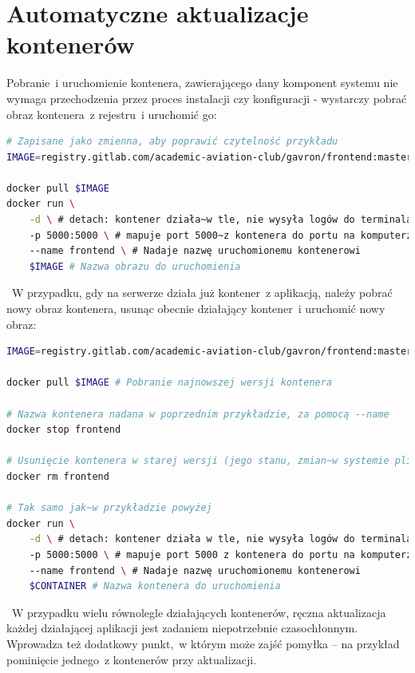 \section{Automatyczne aktualizacje kontenerów} \label{ouroboros}

Pobranie~i uruchomienie kontenera, zawierającego dany komponent systemu
nie wymaga przechodzenia przez proces instalacji czy konfiguracji - wystarczy
pobrać obraz kontenera~z rejestru~i uruchomić go:

\begin{lstlisting}[language=bash, label=list:docker_clone_run_example,caption={Pobranie~i uruchomienie obrazu dockera, zawierającego aplikację}, basicstyle=\footnotesize\ttfamily]
# Zapisane jako zmienna, aby poprawić czytelność przykładu 
IMAGE=registry.gitlab.com/academic-aviation-club/gavron/frontend:master

docker pull $IMAGE
docker run \
    -d \ # detach: kontener działa~w tle, nie wysyła logów do terminala
    -p 5000:5000 \ # mapuje port 5000~z kontenera do portu na komputerze  
    --name frontend \ # Nadaje nazwę uruchomionemu kontenerowi
    $IMAGE # Nazwa obrazu do uruchomienia 
\end{lstlisting}
~W przypadku, gdy na serwerze działa już kontener~z aplikacją, należy
pobrać nowy obraz kontenera, usunąc obecnie działający kontener~i uruchomić
nowy obraz:

\begin{lstlisting}[language=bash, label=list:docker_update_container,caption={Aktualizacja kontenerów}, basicstyle=\footnotesize\ttfamily]
IMAGE=registry.gitlab.com/academic-aviation-club/gavron/frontend:master

docker pull $IMAGE # Pobranie najnowszej wersji kontenera

# Nazwa kontenera nadana w poprzednim przykładzie, za pomocą --name
docker stop frontend

# Usunięcie kontenera w starej wersji (jego stanu, zmian~w systemie plików)
docker rm frontend

# Tak samo jak~w przykładzie powyżej
docker run \
    -d \ # detach: kontener działa w tle, nie wysyła logów do terminala
    -p 5000:5000 \ # mapuje port 5000 z kontenera do portu na komputerze  
    --name frontend \ # Nadaje nazwę uruchomionemu kontenerowi
    $CONTAINER # Nazwa kontenera do uruchomienia 
\end{lstlisting}
~W przypadku wielu równolegle działających kontenerów, ręczna aktualizacja 
każdej działającej aplikacji jest zadaniem niepotrzebnie czasochłonnym.
Wprowadza też dodatkowy punkt,~w którym może zajść pomyłka -- na przykład
pominięcie jednego~z kontenerów przy aktualizacji.

